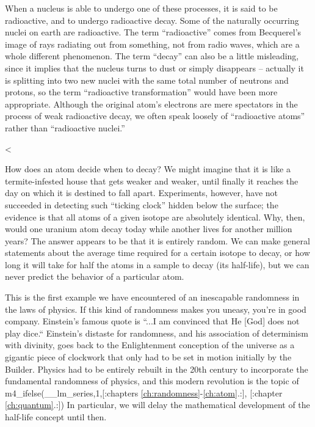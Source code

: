         When a nucleus is able to undergo one of these processes, it
        is said to be radioactive, and to undergo radioactive decay.
        Some of the naturally occurring nuclei on earth are
        radioactive. The term ``radioactive'' comes from Becquerel's
        image of rays radiating out from something, not from radio
        waves, which are a whole different phenomenon. The term
        ``decay'' can also be a little misleading, since it implies
        that the nucleus turns to dust or simply disappears --
        actually it is splitting into two new nuclei with the
        same total number of neutrons and protons, so the term
        ``radioactive transformation'' would have been more
        appropriate. Although the original atom's electrons are mere
        spectators in the process of weak radioactive decay, we
        often speak loosely of ``radioactive atoms'' rather than
        ``radioactive nuclei.''

    <%

        How does an atom decide when to decay? We might imagine that
        it is like a termite-infested house that gets weaker and
        weaker, until finally it reaches the day on which it is
        destined to fall apart. Experiments, however, have not
        succeeded in detecting such ``ticking clock'' hidden below
        the surface; the evidence is that all atoms of a given
        isotope are absolutely identical. Why, then, would one
        uranium atom decay today while another lives for another
        million years? The answer appears to be that it is entirely
        random. We can make general statements about the average
        time required for a certain isotope to decay, or how long it
        will take for half the atoms in a sample to decay (its
        half-life), but we can never predict the behavior of a particular atom.

        This is the first example we have encountered of an
        inescapable randomness in the laws of physics. If this kind
        of randomness makes you uneasy, you're in good company. 
        Einstein's famous quote is ``...I am convinced that He [God]
        does not play dice.``  Einstein's distaste for randomness,
        and his association of determinism with divinity, goes back
        to the Enlightenment conception of the universe as a
        gigantic piece of clockwork that only had to be set in
        motion initially by the Builder. Physics had to be entirely
        rebuilt in the 20th century to incorporate the fundamental
        randomness of physics, and this modern revolution is the
        topic of %
        m4_ifelse(__lm_series,1,[:chapters \ref{ch:randomness}-\ref{ch:atom}.:],
        [:chapter \ref{ch:quantum}.:]) In particular, we will delay
        the mathematical development of the half-life concept until then.


